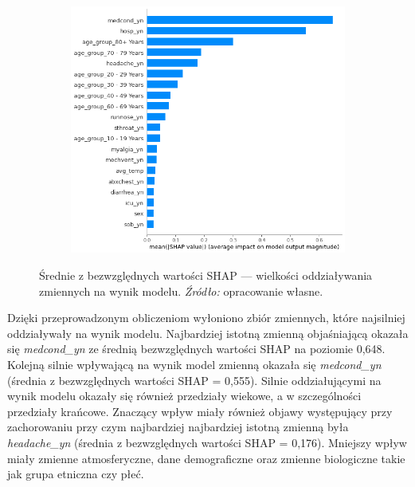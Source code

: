 \documentclass[polish, twoside, 12pt, a4paper]{article}
\theoremstyle{definition}
\theoremstyle{plain}
\theoremstyle{remark}
\begin{document}
\begin{figure}[H]
  \centering
  \begin{subfigure}[t]{\textwidth}
	\centering
    \includegraphics[width=10cm]{shap_abs.png}
  \end{subfigure}
  \captionsetup{margin=10pt,font=small,labelfont=bf,width=.8\textwidth}
  \caption{Średnie z bezwzględnych wartości SHAP  --- wielkości oddziaływania zmiennych na wynik modelu. \textit{Źródło:} opracowanie własne.}
\end{figure}

Dzięki przeprowadzonym obliczeniom wyłoniono zbiór zmiennych, które najsilniej oddziaływały na wynik modelu. Najbardziej istotną zmienną objaśniającą okazała się \emph{medcond\_yn} ze średnią bezwzględnych wartości SHAP na poziomie 0,648. Kolejną silnie wpływającą na wynik model zmienną okazała się \emph{medcond\_yn} (średnia z bezwzględnych wartości SHAP = 0,555). Silnie oddziałującymi na wynik modelu okazały się również przedziały wiekowe, a w szczególności przedziały krańcowe. Znaczący wpływ miały również objawy występujący przy zachorowaniu przy czym najbardziej najbardziej istotną zmienną była \emph{headache\_yn} (średnia z bezwzględnych wartości SHAP = 0,176). Mniejszy wpływ miały zmienne atmosferyczne, dane demograficzne oraz zmienne biologiczne takie jak grupa etniczna czy płeć.
\end{document}
